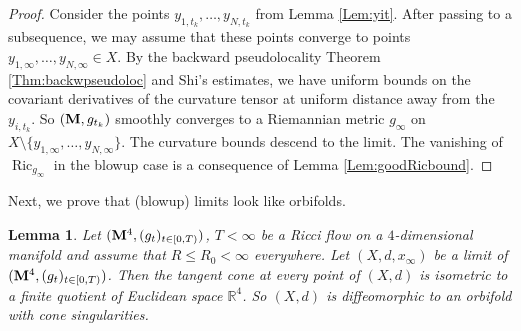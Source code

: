 \documentclass[11pt]{amsart}
\numberwithin{equation}{section}
\newcommand{\IR}{\mathbb{R}}
\newtheorem{lemma}[theorem]{Lemma}
\def\M{{\bf M}}
\DeclareMathOperator{\Ric}{Ric}
\numberwithin{equation}{section}
\begin{document}
\begin{proof}
Consider the points $y_{1,t_k}, \ldots, y_{N,t_k}$ from Lemma \ref{Lem:yit}.
After passing to a subsequence, we may assume that these points converge to points $y_{1, \infty}, \ldots, y_{N, \infty} \in X$.
By the backward pseudolocality Theorem \ref{Thm:backwpseudoloc} and Shi's estimates, we have uniform bounds on the covariant derivatives of the curvature tensor at uniform distance away from the $y_{i, t_k}$.
So $(\M, g_{t_k})$ smoothly converges to a Riemannian metric $g_\infty$ on $X \setminus \{ y_{1, \infty}, \ldots, y_{N, \infty} \}$.
The curvature bounds descend to the limit.
The vanishing of $\Ric_{g_\infty}$ in the blowup case is a consequence of Lemma \ref{Lem:goodRicbound}.
\end{proof}

Next, we prove that (blowup) limits look like orbifolds.

\begin{lemma} \label{Lem:itsanorbifold}
Let $(\M^4, (g_t)_{t \in [0,T)})$, $T < \infty$ be a Ricci flow on a $4$-dimensional manifold and assume that $R \leq R_0 < \infty$ everywhere.
Let $(X, d, x_\infty)$ be a limit of $(\M^4, (g_t)_{t \in [0,T)})$.
Then the tangent cone at every point of $(X,d)$ is isometric to a finite quotient of Euclidean space $\IR^4$.
So $(X, d)$ is diffeomorphic to an orbifold with cone singularities.
\end{lemma}
\end{document}
